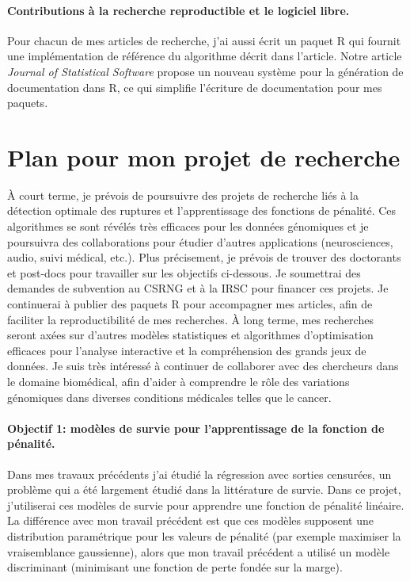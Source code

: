 \documentclass{article}
\begin{document}
\paragraph{Contributions à la recherche reproductible et le logiciel
  libre.} Pour chacun de mes articles de recherche, j'ai aussi écrit
un paquet R qui fournit une implémentation de référence du
algorithme décrit dans l'article. Notre article \emph{Journal of
  Statistical Software} \citep{hocking13:inlinedocs} propose un
nouveau système pour la génération de documentation dans R, ce qui
simplifie l'écriture de documentation pour mes paquets.

\section{Plan pour mon projet de recherche}

À court terme, je prévois de poursuivre des projets de recherche liés à
la détection optimale des ruptures et l'apprentissage des fonctions de
pénalité. Ces algorithmes se sont révélés très efficaces pour les
données génomiques et je poursuivra des collaborations pour étudier
d'autres applications (neurosciences, audio, suivi médical,
etc.). Plus précisement, je prévois de trouver des doctorants et
post-docs pour travailler sur les objectifs ci-dessous. Je soumettrai
des demandes de subvention au CSRNG et à la IRSC pour financer ces
projets. Je continuerai à publier des paquets R pour accompagner
mes articles, afin de faciliter la reproductibilité de mes
recherches. À long terme, mes recherches seront axées sur d'autres
modèles statistiques et algorithmes d'optimisation efficaces pour
l'analyse interactive et la compréhension des grands jeux de
données. Je suis très intéressé à continuer de collaborer
avec des chercheurs dans le domaine biomédical, afin d'aider à
comprendre le rôle des variations génomiques dans diverses
conditions médicales telles que le cancer.

\paragraph{Objectif 1: modèles de survie pour l'apprentissage de la
  fonction de pénalité.} Dans mes travaux précédents j'ai étudié la
régression avec sorties censurées, un problème qui a été largement
étudié dans la littérature de survie. Dans ce projet, j'utiliserai ces
modèles de survie pour apprendre une fonction de pénalité linéaire. La
différence avec mon travail précédent est que ces modèles supposent
une distribution paramétrique pour les valeurs de pénalité (par
exemple maximiser la vraisemblance gaussienne), alors que mon travail
précédent a utilisé un modèle discriminant (minimisant une fonction de
perte fondée sur la marge).
\end{document}
